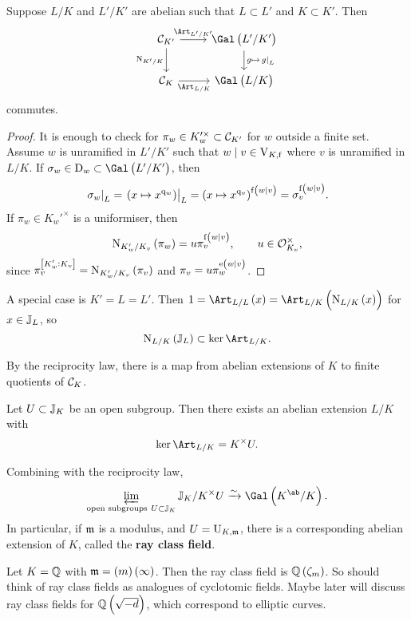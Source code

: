 \begin{proposition}
Suppose $ L / K $ and $ L' / K' $ are abelian such that $ L \subset L' $ and $ K \subset K' $. Then
$$
\begin{tikzcd}
\CCC_{K'} \arrow{r}{\Art_{L' / K'}} \arrow{d}[swap]{\N_{K' / K}} & \Gal\br{L' / K'} \arrow{d}{g \mapsto \eval{g}_L} \\
\CCC_K \arrow{r}[swap]{\Art_{L / K}} & \Gal\br{L / K}
\end{tikzcd}
$$
commutes.
\end{proposition}

\begin{proof}
It is enough to check for $ \pi_w \in K_w'^\times \subset \mathcal{C}_{K'} $ for $ w $ outside a finite set. Assume $ w $ is unramified in $ L' / K' $ such that $ w \mid v \in \mathrm{V}_{K, \mathrm{f}} $ where $ v $ is unramified in $ L / K $. If $ \sigma_w \in \D_w \subset \Gal\br{L' / K'} $, then
$$ \eval{\sigma_w}_L = \eval{\br{x \mapsto x^{\q_w}}}_L = \br{x \mapsto x^{\q_v}}^{\f\br{w \mid v}} = \sigma_v^{\f\br{w \mid v}}. $$
If $ \pi_w \in K_w'^\times $ is a uniformiser, then
$$ \N_{K_w' / K_v}\br{\pi_w} = u\pi_v^{\f\br{w \mid v}}, \qquad u \in \OOO_{K_v}^\times, $$
since $ \pi_v^{\sbr{K_w' : K_v}} = \N_{K_w' / K_v}\br{\pi_v} $ and $ \pi_v = u\pi_w^{\e\br{w \mid v}} $.
\end{proof}

\begin{example*}
A special case is $ K' = L = L' $. Then $ 1 = \Art_{L / L}\br{x} = \Art_{L / K}\br{\N_{L / K}\br{x}} $ for $ x \in \mathbb{J}_L $, so
$$ \N_{L / K}\br{\JJ_L} \subset \ker \Art_{L / K}. $$
\end{example*}

By the reciprocity law, there is a map from abelian extensions of $ K $ to finite quotients of $ \mathcal{C}_K $.

\begin{theorem}
Let $ U \subset \mathbb{J}_K $ be an open subgroup. Then there exists an abelian extension $ L / K $ with
$$ \ker \Art_{L / K} = K^\times U. $$
\end{theorem}

Combining with the reciprocity law,
$$ \varprojlim_{\text{open subgroups} \ U \subset \JJ_K} \JJ_K / K^\times U \xrightarrow{\sim} \Gal\br{K^{\ab} / K}. $$
In particular, if $ \mathfrak{m} $ is a modulus, and $ U = \mathrm{U}_{K, \mathfrak{m}} $, there is a corresponding abelian extension of $ K $, called the \textbf{ray class field}.

\begin{example*}
Let $ K = \mathbb{Q} $ with $ \mmm = \br{m}\br{\infty} $. Then the ray class field is $ \QQ\br{\zeta_m} $. So should think of ray class fields as analogues of cyclotomic fields. Maybe later will discuss ray class fields for $ \QQ\br{\sqrt{-d}} $, which correspond to elliptic curves.
\end{example*}

